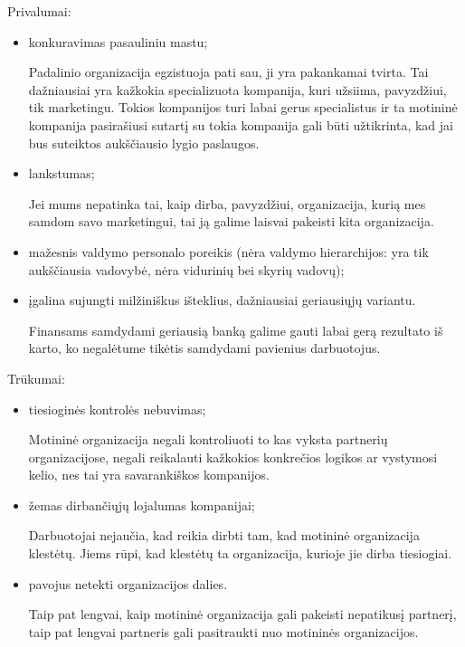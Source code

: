 Privalumai:
\begin{itemize}
  \item konkuravimas pasauliniu mastu;
    \begin{note}
      Padalinio organizacija egzistuoja pati sau, ji yra pakankamai
      tvirta. Tai dažniausiai yra kažkokia specializuota kompanija,
      kuri užsiima, pavyzdžiui, tik marketingu. Tokios kompanijos
      turi labai gerus specialistus ir ta motininė kompanija pasirašiusi
      sutartį su tokia kompanija gali būti užtikrinta, kad jai bus
      suteiktos aukščiausio lygio paslaugos.
    \end{note}
  \item lankstumas;
    \begin{note}
      Jei mums nepatinka tai, kaip dirba, pavyzdžiui, organizacija, kurią
      mes samdom savo marketingui, tai ją galime laisvai pakeisti
      kita organizacija.
    \end{note}
  \item mažesnis valdymo personalo poreikis (nėra valdymo hierarchijos:
    yra tik aukščiausia vadovybė, nėra vidurinių bei skyrių vadovų);
  \item įgalina sujungti milžiniškus išteklius, dažniausiai geriausiųjų
    variantu.
    \begin{exmp}
      Finansams samdydami geriausią banką galime gauti labai gerą
      rezultato iš karto, ko negalėtume tikėtis samdydami pavienius
      darbuotojus.
    \end{exmp}
\end{itemize}

Trūkumai:
\begin{itemize}
  \item tiesioginės kontrolės nebuvimas;
    \begin{note}
      Motininė organizacija negali kontroliuoti to kas vyksta partnerių
      organizacijose, negali reikalauti kažkokios konkrečios logikos
      ar vystymosi kelio, nes tai yra savarankiškos kompanijos.
    \end{note}
  \item žemas dirbančiųjų lojalumas kompanijai;
    \begin{note}
      Darbuotojai nejaučia, kad reikia dirbti tam, kad motininė
      organizacija klestėtų. Jiems rūpi, kad klestėtų ta organizacija,
      kurioje jie dirba tiesiogiai.
    \end{note}
  \item pavojus netekti organizacijos dalies.
    \begin{note}
      Taip pat lengvai, kaip motininė organizacija gali pakeisti
      nepatikusį partnerį, taip pat lengvai partneris gali pasitraukti
      nuo motininės organizacijos.
    \end{note}
\end{itemize}

